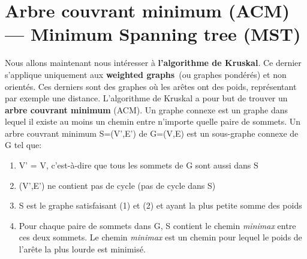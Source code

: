 \section{Arbre couvrant minimum (ACM) — Minimum Spanning tree (MST)}
    Nous allons maintenant nous intéresser à \textbf{l'algorithme de Kruskal}. Ce dernier s'applique uniquement aux \textbf{weighted graphs}~(ou graphes pondérés) et non orientés. Ces derniers sont des graphes où les arêtes ont des poids, représentant par exemple une distance. L'algorithme de Kruskal a pour but de trouver un \textbf{arbre couvrant minimum} (ACM). Un graphe connexe est un graphe dans lequel il existe au moins un chemin entre n'importe quelle paire de sommets. Un arbre couvrant minimum S=(V',E') de G=(V,E) est un sous-graphe connexe de G tel que\!:
    \begin{enumerate}
        \item V' = V, c'est-à-dire que tous les sommets de G sont aussi dans S
        \item (V',E') ne contient pas de cycle (pas de cycle dans S)
        \item S est le graphe satisfaisant (1) et (2) et ayant la plus petite somme des poids
        \item Pour chaque paire de sommets dans G, S contient le chemin \textit{minimax} entre ces deux sommets. Le chemin \textit{minimax} est un chemin pour lequel le poids de l'arête la plus lourde est minimisé.
    \end{enumerate}
    

